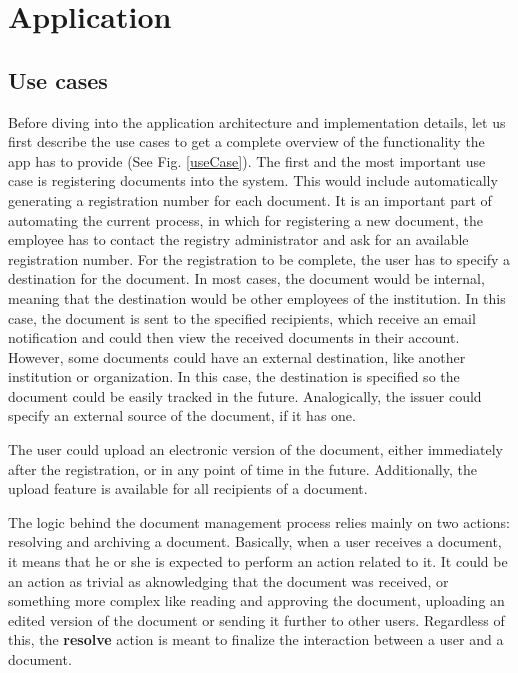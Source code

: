 \chapter{Application}
\label{chapter:application}


\section{Use cases}
\label{section:useCases}

Before diving into the application architecture and implementation details, let us first describe the use cases to get a complete overview of the functionality the app has to provide (See Fig. \ref{useCase}). The first and the most important use case is registering documents into the system. This would include automatically generating a registration number for each document. It is an important part of automating the current process, in which for registering a new document, the employee has to contact the registry administrator and ask for an available registration number. For the registration to be complete, the user has to specify a destination for the document. In most cases, the document would be internal, meaning that the destination would be other employees of the institution. In this case, the document is sent to the specified recipients, which receive an email notification and could then view the received documents in their account. However, some documents could have an external destination, like another institution or organization. In this case, the destination is specified so the document could be easily tracked in the future. Analogically, the issuer could specify an external source of the document, if it has one.

The user could upload an electronic version of the document, either immediately after the registration, or in any point of time in the future. Additionally, the upload feature is available for all recipients of a document.

The logic behind the document management process relies mainly on two actions: resolving and archiving a document. Basically, when a user receives a document, it means that he or she is expected to perform an action related to it. It could be an action as trivial as aknowledging that the document was received, or something more complex like reading and approving the document, uploading an edited version of the document or sending it further to other users. Regardless of this, the \textbf{resolve} action is meant to finalize the interaction between a user and a document.

